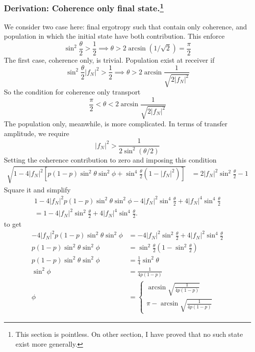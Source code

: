 \documentclass[../../../main.tex]{subfiles}
\begin{document}
\subsubsection[Derivation: Coherence only final state.]{Derivation: Coherence only final state.\footnote{This section is pointless. On other section, I have proved that no such state exist more generally.}}

We consider two case here: final ergotropy such that contain only coherence, and population in which the initial state have both contribution.
This enforce
\begin{equation*}
  \sin ^2 \frac{\theta }{2 }>\frac{1 }{2} \implies \theta>2 \arcsin (1/\sqrt{2}) = \frac{\pi }{2}
\end{equation*}
The first case, coherence only, is trivial.
Population exist at receiver if
\begin{equation*}
  \sin ^2 \frac{\theta }{2 }|f_N|^2>\frac{1 }{2} \implies \theta>2 \arcsin \frac{1 }{\sqrt{2|f_N|^2}}
\end{equation*}
So the condition for coherence only transport
\begin{equation*}
  \frac{\pi }{2 }<\theta<2 \arcsin \frac{1 }{\sqrt{2|f_N|^2}}
\end{equation*}
The population only, meanwhile, is more complicated.
In terms of transfer amplitude, we require
\begin{equation*}
  |f_N|^2>\frac{1}{2\sin^2(\theta/2)}
\end{equation*}
Setting the coherence contribution to zero and imposing this condition
\begin{align*}
  \sqrt{1-4 |f_N|^2\left[p(1-p)\sin ^2\theta \sin^2\phi+\sin ^4\frac{\theta}{2}(1-|f_N|^2)\right]}
   & =
  2|f_N|^2\sin^2\frac{\theta}{2}-1
\end{align*}
Square it and simplify
\begin{multline*}
  1
  -4|f_N|^2p(1-p)\sin^2\theta\sin^2\phi
  -4|f_N|^2\sin^4\frac{\theta}{2}
  +4|f_N|^4\sin^4\frac{\theta}{2}
  \\
  =
  1
  -4|f_N|^2\sin^2\frac{\theta}{2}
  +4|f_N|^4\sin^4\frac{\theta}{2}.
\end{multline*}
to get
\begin{align*}
  -4|f_N|^2p(1-p)\sin^2\theta\sin^2\phi
       & = -4|f_N|^2\sin^2\frac{\theta}{2}+4|f_N|^2\sin^4\frac{\theta}{2}                      \\
  p(1-p)\sin^2\theta\sin^2\phi
       & = \sin^2\frac{\theta}{2}\left( 1- \sin ^2 \frac{\theta }{2} \right)                   \\
  p(1-p)\sin^2\theta\sin^2\phi
       & =  \frac{1 }{4 }\sin^2\theta                                                          \\
  \sin^2\phi
       & = \frac{1}{4p(1-p)}                                                                   \\
  \phi & = \begin{cases}
             \arcsin\sqrt{\frac{1}{4p(1-p)}} \\ \pi - \arcsin\sqrt{\frac{1}{4p(1-p)}}
           \end{cases}
\end{align*}
\end{document}
